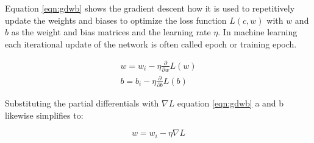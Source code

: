 Equation \ref{eqn:gdwb} shows the gradient descent how it is used to repetitively update the weights
and biases to optimize the loss function $L(c,w)$ with $w$ and $b$ as the weight and bias matrices
and the learning rate $\eta$. In machine learning each iterational update of the network is often
called epoch or training epoch.

\begin{subequations}
 \begin{align}
  w = w_i - \eta \frac{\partial}{\partial w}L(w) \\
  b = b_i - \eta \frac{\partial}{\partial b}L(b) 
 \end{align}
 \label{eqn:gdwb}
\end{subequations}

Substituting the partial differentials with $\nabla L$ equation \ref{eqn:gdwb} a and b likewise simplifies to:

\begin{equation}
 w = w_i - \eta \nabla L
 \label{eqn:simplegd} 
\end{equation}

